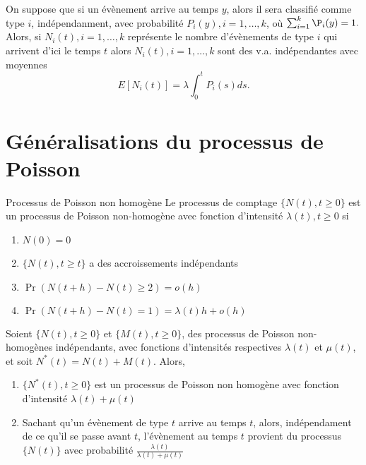 \begin{proposition}{}{}
	On suppose que si un évènement arrive au temps $y$, alors il sera classifié comme type $i$, indépendanment, avec probabilité $P_i(y), i = 1, \dots, k$, où $\sum_{i = 1}^{k}\P_i(y) = 1.$ Alors, si $N_i(t), i = 1, \dots, k$ représente le nombre d'évènements de type $i$ qui arrivent d'ici le temps $t$ alors $N_i(t), i = 1, \dots, k$ sont des v.a. indépendantes avec moyennes 
	$$E[N_i(t)] = \lambda \int_{0}^{t}P_i(s) ds. $$
\end{proposition}

\section{Généralisations du processus de Poisson}

\begin{definition}{Processus de Poisson non homogène}{}
	Le processus de comptage $\{N(t), t\geq 0\}$ est un processus de Poisson non-homogène avec fonction d'intensité $\lambda(t), t\geq 0$ si 
	\begin{enumerate}
		\item $\displaystyle N(0) = 0$
		\item $\displaystyle \{N(t), t\geq t\}$ a des accroissements indépendants
		\item $\displaystyle \Pr(N(t + h) - N(t) \geq 2) = o(h)$
		\item $\displaystyle \Pr(N(t + h) - N(t) = 1) = \lambda(t) h + o(h)$
	\end{enumerate}
\end{definition}

\begin{proposition}{}{}
	Soient $\{N(t), t \geq 0\}$ et $\{M(t), t\geq 0\}$, des processus de Poisson non-homogènes indépendants, avec fonctions d'intensités respectives $\lambda(t)$ et $\mu(t)$, et soit $N^*(t) = N(t) + M(t)$. Alors, 
	\begin{enumerate}
		\item $\{N^*(t), t\geq 0\}$ est un processus de Poisson non homogène avec fonction d'intensité $\lambda(t) + \mu(t)$
		\item Sachant qu'un évènement de type $t$ arrive au temps $t$, alors, indépendament de ce qu'il se passe avant $t$, l'évènement au temps $t$ provient du processus $\{N(t)\}$ avec probabilité $\frac{\lambda(t)}{\lambda(t) + \mu(t)}$
	\end{enumerate}
\end{proposition}

